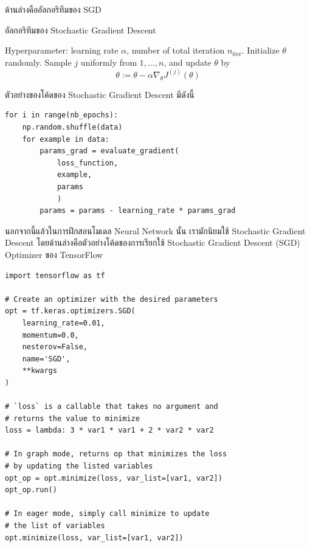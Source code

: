 \noindent ด้านล่างคืออัลกอริทึมของ SGD

\begin{algorithm}[H]
    \caption{อัลกอริทึมของ Stochastic Gradient Descent}
    \label{alg:sgd}
    \begin{algorithmic}
        \State Hyperparameter: learning rate $\alpha$, number of total iteration $n_\text{iter}$.
        \State Initialize $\theta$ randomly.
        \State Sample $j$ uniformly from ${1,\ldots,n}$, and update $\theta$ by
        \begin{equation*}
            \theta := \theta - \alpha\nabla_\theta J^{(j)}(\theta)
        \end{equation*}
        \EndFor
    \end{algorithmic}
\end{algorithm}

\noindent ตัวอย่างของโค้ดของ Stochastic Gradient Descent มีดังนี้

\begin{lstlisting}[style=MyPython]
for i in range(nb_epochs):
    np.random.shuffle(data)
    for example in data:
        params_grad = evaluate_gradient(
            loss_function, 
            example, 
            params
            )
        params = params - learning_rate * params_grad
\end{lstlisting}

\vspace{1em}
\noindent นอกจากนี้แล้วในการฝึกสอนโมเดล Neural Network นั้น เรามักนิยมใช้ Stochastic Gradient Descent โดยด้านล่างคือตัวอย่างโค้ดของการเรียกใช้ Stochastic Gradient Descent (SGD) Optimizer ของ TensorFlow

\begin{lstlisting}[style=MyPython]
import tensorflow as tf

# Create an optimizer with the desired parameters
opt = tf.keras.optimizers.SGD(
    learning_rate=0.01,
    momentum=0.0,
    nesterov=False,
    name='SGD',
    **kwargs
)

# `loss` is a callable that takes no argument and 
# returns the value to minimize
loss = lambda: 3 * var1 * var1 + 2 * var2 * var2

# In graph mode, returns op that minimizes the loss 
# by updating the listed variables
opt_op = opt.minimize(loss, var_list=[var1, var2])
opt_op.run()

# In eager mode, simply call minimize to update 
# the list of variables
opt.minimize(loss, var_list=[var1, var2])
\end{lstlisting}

